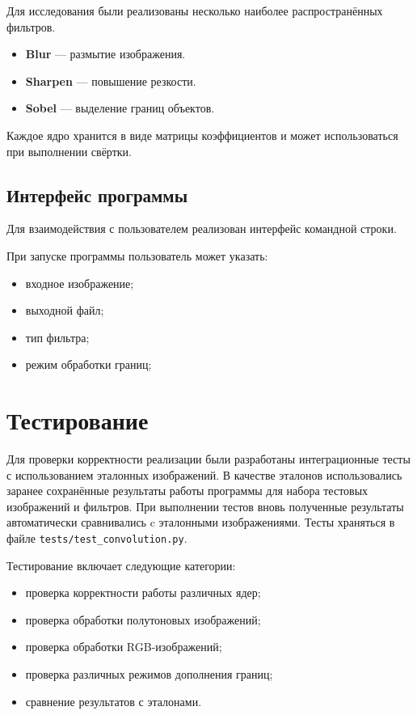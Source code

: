 \documentclass[a4paper]{article}
\begin{document}
Для исследования были реализованы несколько наиболее распространённых фильтров.
\begin{itemize}
    \item \textbf{Blur} --- размытие изображения.
    \item \textbf{Sharpen} --- повышение резкости.
    \item \textbf{Sobel} --- выделение границ объектов.
\end{itemize}

Каждое ядро хранится в виде матрицы коэффициентов и может использоваться при выполнении свёртки.

\subsection{Интерфейс программы}

Для взаимодействия с пользователем реализован интерфейс командной строки.

При запуске программы пользователь может указать:
\begin{itemize}
    \item входное изображение;
    \item выходной файл;
    \item тип фильтра;
    \item режим обработки границ;
\end{itemize}

\section{Тестирование}

Для проверки корректности реализации были разработаны интеграционные тесты с использованием эталонных изображений. В качестве эталонов использовались заранее сохранённые результаты работы программы для набора тестовых изображений и фильтров. При выполнении тестов вновь полученные результаты автоматически сравнивались c эталонными изображениями. Тесты храняться в файле \verb|tests/test_convolution.py|.

Тестирование включает следующие категории:
\begin{itemize}
    \item проверка корректности работы различных ядер;
    \item проверка обработки полутоновых изображений;
    \item проверка обработки RGB-изображений;
    \item проверка различных режимов дополнения границ;
    \item сравнение результатов с эталонами.
\end{itemize}
\end{document}
